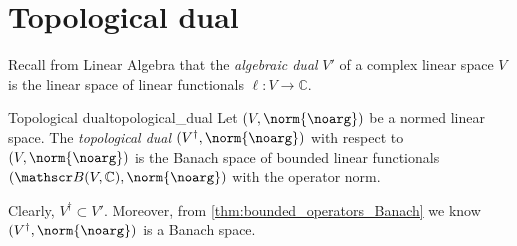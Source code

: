 \section{Topological dual}
Recall from Linear Algebra that the \emph{algebraic dual} \(V'\) of a complex linear space \(V\) is the linear space of linear functionals \(\ell : V \to \mathbb{C}\).
\begin{definition}{Topological dual}{topological_dual}
    Let \((V, \norm{\noarg})\) be a normed linear space. The \emph{topological dual} \((V^\dag, \norm{\noarg})\) with respect to \((V, \norm{\noarg})\) is the Banach space of bounded linear functionals \((\bounded(V, \mathbb{C}), \norm{\noarg})\) with the operator norm.
\end{definition}
\begin{remark}
    Clearly, \(V^\dag \subset V'\). Moreover, from \cref{thm:bounded_operators_Banach} we know \((V^\dag, \norm{\noarg})\) is a Banach space.
\end{remark}

